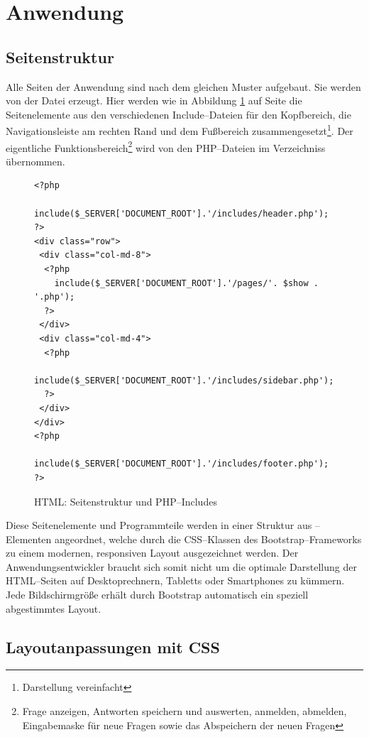 \section{Anwendung}
\label{sec:anwendung}
\subsection{Seitenstruktur}

Alle Seiten der Anwendung sind nach dem gleichen Muster aufgebaut. Sie werden von der Datei  erzeugt. Hier werden wie in Abbildung \ref{fig:struktur} auf Seite \pageref{fig:struktur} die Seitenelemente aus den verschiedenen Include--Dateien für den Kopfbereich, die Navigationsleiste am rechten Rand und dem Fußbereich zusammengesetzt\footnote{Darstellung vereinfacht}. Der eigentliche Funktionsbereich\footnote{Frage anzeigen, Antworten speichern und auswerten, anmelden, abmelden, Eingabemaske für neue Fragen sowie das Abspeichern der neuen Fragen} wird von den PHP--Dateien im Verzeichniss  übernommen.

\begin{figure}[h]
\begin{spacing}{1.0}	
\begin{verbatim}
<?php 
  include($_SERVER['DOCUMENT_ROOT'].'/includes/header.php'); 
?>
<div class="row">
 <div class="col-md-8">
  <?php 
    include($_SERVER['DOCUMENT_ROOT'].'/pages/'. $show . '.php'); 
  ?> 
 </div>
 <div class="col-md-4">
  <?php 
    include($_SERVER['DOCUMENT_ROOT'].'/includes/sidebar.php'); 
  ?>
 </div>	  
</div>
<?php 
  include($_SERVER['DOCUMENT_ROOT'].'/includes/footer.php'); 
?>
\end{verbatim}
\caption{HTML: Seitenstruktur und PHP--Includes}
\label{fig:struktur}
\end{spacing}
\end{figure}

Diese Seitenelemente und Programmteile werden in einer Struktur aus --Ele\-menten angeordnet, welche durch die CSS--Klassen des Bootstrap--Frameworks zu einem modernen, responsiven Layout ausgezeichnet werden. Der Anwendungsentwickler braucht sich somit nicht um die optimale Darstellung der HTML--Seiten auf Desktoprechnern, Tabletts oder Smartphones zu kümmern. Jede Bildschirmgröße erhält durch Bootstrap automatisch ein speziell abgestimmtes Layout.

\subsection{Layoutanpassungen mit CSS}

